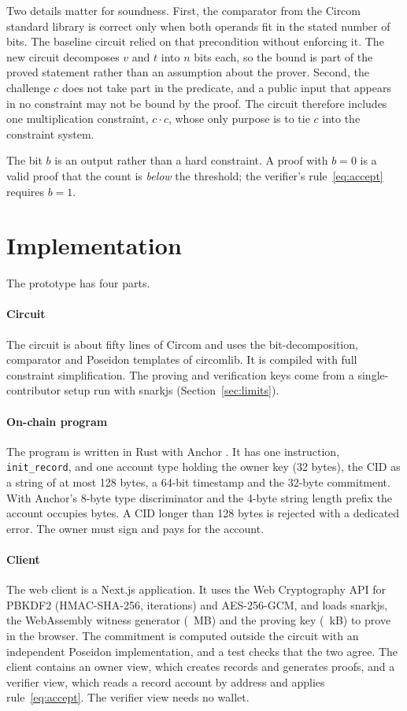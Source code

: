Two details matter for soundness. First, the comparator from the Circom
standard library is correct only when both operands fit in the stated number
of bits. The baseline circuit relied on that precondition without enforcing
it. The new circuit decomposes $v$ and $t$ into $n$ bits each, so the bound
is part of the proved statement rather than an assumption about the prover.
Second, the challenge $c$ does not take part in the predicate, and a public
input that appears in no constraint may not be bound by the proof. The
circuit therefore includes one multiplication constraint, $c \cdot c$, whose
only purpose is to tie $c$ into the constraint system.

The bit $b$ is an output rather than a hard constraint. A proof with $b = 0$
is a valid proof that the count is \emph{below} the threshold; the
verifier's rule~\eqref{eq:accept} requires $b = 1$.

\section{Implementation}\label{sec:impl}

The prototype has four parts.

\paragraph{Circuit} The circuit is about fifty lines of Circom and uses the
bit-decomposition, comparator and Poseidon templates of circomlib. It is
compiled with full constraint simplification. The proving and verification
keys come from a single-contributor setup run with snarkjs
(Section~\ref{sec:limits}).

\paragraph{On-chain program} The program is written in Rust with Anchor
\EnvAnchorLang. It has one instruction, \texttt{init\_record}, and one
account type holding the owner key (32 bytes), the CID as a string of at
most 128 bytes, a 64-bit timestamp and the 32-byte commitment. With Anchor's
8-byte type discriminator and the 4-byte string length prefix the account
occupies \AccountBytes{} bytes. A CID longer than 128 bytes is rejected with
a dedicated error. The owner must sign and pays for the account.

\paragraph{Client} The web client is a Next.js application. It uses the Web
Cryptography API for PBKDF2 (HMAC-SHA-256, \KdfIterations{} iterations) and
AES-256-GCM, and loads snarkjs, the WebAssembly witness generator
(\NewWasmMb~MB) and the proving key (\NewZkeyKb~kB) to prove in the browser.
The commitment is computed outside the circuit with an independent Poseidon
implementation, and a test checks that the two agree. The client contains an
owner view, which creates records and generates proofs, and a verifier view,
which reads a record account by address and applies rule~\eqref{eq:accept}.
The verifier view needs no wallet.

